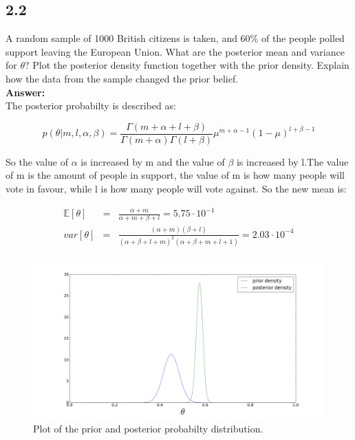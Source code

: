 \documentclass[a4paper]{article}
\begin{document}
\subsection*{2.2}

A random sample of 1000 British citizens is taken, and 60\% of the people polled support leaving the European Union. What are the posterior mean and variance for $\theta$? Plot the posterior density function together with the prior density. Explain how the data from the sample changed the prior belief.\\

\textbf{Answer:}\\

The posterior probabilty is described as:

\begin{equation}
p(\theta|m,l,\alpha,\beta) = \frac{\Gamma(m+\alpha+l+\beta)}{\Gamma(m+\alpha)\Gamma(l+\beta)} \mu^{m+\alpha-1}(1-\mu)^{l+\beta-1}
\end{equation}

So the value of $\alpha$ is increased by m and the value of $\beta$ is increased by l.The value of m is the amount of people in support, the value of m is how many people will vote in favour, while l is how many people will vote against. So the new mean is:

\begin{eqnarray}
\mathbb E [\theta] &=& \frac{\alpha + m}{\alpha + m + \beta + l}= 5.75 \cdot 10^{-1}\\
var[\theta]  &=& \frac{(\alpha + m ) ( \beta + l)}{(\alpha + \beta + l + m)^2(\alpha + \beta + m + l + 1 )} = 2.03\cdot 10^{-4}
\end{eqnarray}

\begin{figure}[H]
\includegraphics[width=\textwidth]{BetaPlotEx2,2.png}
\caption{Plot of the prior and posterior probabilty distribution. }
\end{figure}
\end{document}
